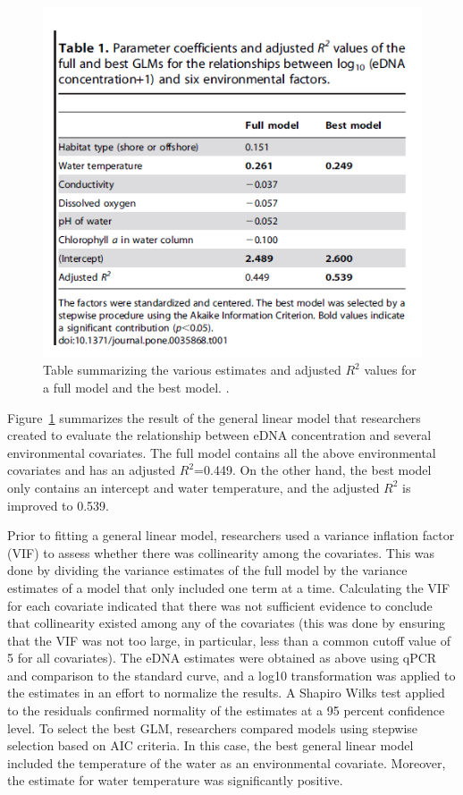 \begin{figure}[H]
\includegraphics{Chapter2Images/biomassGLM.png} 
\caption{ Table summarizing the various estimates and adjusted $R^{2}$ values for a full model and the best model.
 \citep{biomass}.}
\label{fig:glm}
\end{figure}

\newpage

 Figure~\ref{fig:glm} summarizes the result of the general linear model that researchers created to evaluate the relationship between eDNA concentration and several environmental covariates. The full model contains all the above environmental covariates and has an adjusted $R^{2}$=0.449. On the other hand, the best model only contains an intercept and water temperature, and the adjusted $R^{2}$ is improved to 0.539.

\vspace{5mm}

Prior to fitting a general linear model, researchers used a variance inflation factor (VIF) to assess whether there was collinearity among the covariates. This was done by dividing the variance estimates of the full model by the variance estimates of a model that only included one term at a time. Calculating the VIF for each covariate indicated that there was not sufficient evidence to conclude that collinearity existed among any of the covariates (this was done by ensuring that the VIF was not too large, in particular, less than a common cutoff value of 5 for all covariates). The eDNA estimates were obtained as above using qPCR and comparison to the standard curve, and a log10 transformation was applied to the estimates in an effort to normalize the results. A Shapiro Wilks test applied to the residuals confirmed normality of the estimates at a 95 percent confidence level.  To select the best GLM, researchers compared models using stepwise selection based on AIC criteria. In this case, the best general linear model included the temperature of the water as an environmental covariate. Moreover, the estimate for water temperature was  significantly positive.

